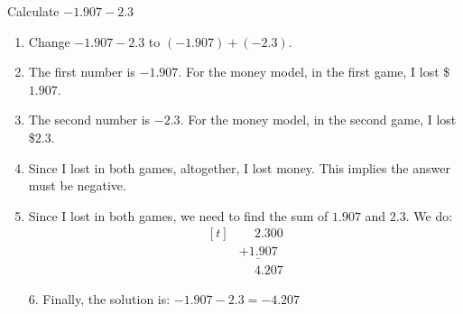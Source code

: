 \begin{myexample}
Calculate $-1.907-2.3$
\end{myexample}
\begin{solution}
\begin{enumerate}
\item Change $-1.907-2.3$ to $(-1.907)+(-2.3)$.
\item The first number is $-1.907$. For the money model, in the first game, I lost \$$1.907$.
\item The second number is $-2.3$. For the money model, in the second game, I lost \$$2.3$.
\item Since I lost in both games, altogether, I lost money. This implies the answer must be negative.
\item Since I lost in both games, we need to find the sum of $1.907$ and $2.3$. We do:
\[
\begin{aligned}[t] 
	&\phantom{+}2.300 \\
	&\underline{+1.907} \\
	&\phantom{+}4.207
\end{aligned}
\]
\item[6.] Finally, the solution is: $-1.907-2.3=-4.207$
\end{enumerate}
\end{solution}

